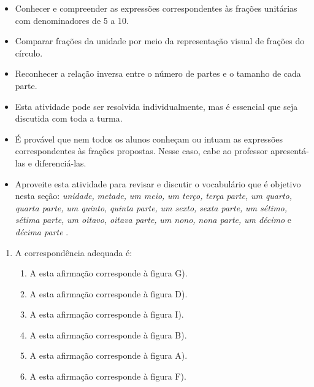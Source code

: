 \clearpage

\begin{atividade}\label{chap1-ativ12}
\objetivos
  \begin{itemize} %
    \item Conhecer e compreender as expressões correspondentes às frações unitárias com denominadores de 5 a 10.
    \item Comparar frações da unidade por meio da representação visual de frações do círculo.
    \item Reconhecer a relação inversa entre o número de partes e o tamanho de cada parte.
\end{itemize} %

\discussoes
\begin{itemize} %
    \item       Esta atividade pode ser resolvida individualmente, mas é essencial que seja discutida com toda a turma.
    \item       É provável que nem todos os alunos conheçam ou intuam as expressões correspondentes às frações propostas. Nesse caso, cabe ao professor apresentá-las e diferenciá-las.
    \item       Aproveite esta atividade para revisar e discutir o vocabulário que é objetivo nesta seção:       {\itshape unidade,}             {\itshape metade,}             {\itshape um meio,}             {\itshape um terço,}             {\itshape terça parte,}             {\itshape um quarto,}             {\itshape quarta parte,}             {\itshape um quinto,}             {\itshape quinta parte,}             {\itshape um sexto,}             {\itshape sexta parte,}             {\itshape um sétimo,}             {\itshape sétima parte,}             {\itshape um oitavo,}             {\itshape oitava parte,}             {\itshape um nono,}             {\itshape nona parte,}             {\itshape um décimo}       e       {\itshape décima parte}      .
\end{itemize} %

\solucao
\begin{enumerate} %
    \item       A correspondência adequada é:
\begin{enumerate} %
        \item           A esta afirmação corresponde à figura G).
        \item           A esta afirmação corresponde à figura D).
        \item           A esta afirmação corresponde à figura I).
        \item           A esta afirmação corresponde à figura B).
        \item           A esta afirmação corresponde à figura A).
        \item           A esta afirmação corresponde à figura F).
\end{enumerate} %


\end{enumerate}
\end{atividade}
